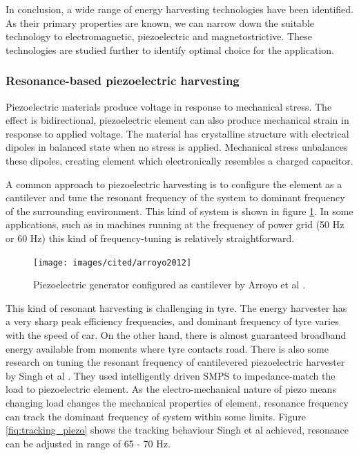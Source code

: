 In conclusion, a wide range of energy harvesting technologies have been identified. As their primary properties are known, we can narrow down the suitable technology to electromagnetic, piezoelectric and magnetostrictive. These technologies are studied further to identify optimal choice for the application.

\subsubsection{Resonance-based piezoelectric harvesting}
Piezoelectric materials produce voltage in response to mechanical stress. The effect is bidirectional, piezoelectric element can also produce mechanical strain in response to applied voltage. The material has crystalline structure with electrical dipoles in balanced state when no stress is applied. Mechanical stress unbalances these dipoles, creating element which electronically resembles a charged capacitor. 

A common approach to piezoelectric harvesting is to configure the element as a cantilever and tune the resonant frequency of the system to dominant frequency of the surrounding environment. This kind of system is shown in figure \ref{fiq:resonant_piezo}. In some applications, such as in machines running at the frequency of power grid (50 Hz or 60 Hz) this kind of frequency-tuning is relatively straightforward.

\begin{figure}[htb]
  \begin{center}
  \texttt{[image: images/cited/arroyo2012]}
  \end{center}
  \caption{Piezoelectric generator configured as cantilever by Arroyo et al \cite{Arroyo2012}.}
  \label{fiq:resonant_piezo}
\end{figure}

This kind of resonant harvesting is challenging in tyre. The energy harvester has a very sharp peak efficiency frequencies, and dominant frequency of tyre varies with the speed of car. On the other hand, there is almost guaranteed broadband energy available from moments where tyre contacts road. There is also some research on tuning the resonant frequency of cantilevered piezoelectric harvester by Singh et al \cite{Singh2012}. They used intelligently driven SMPS to impedance-match the load to piezoelectric element. As the electro-mechanical nature of piezo means changing load changes the mechanical properties of element, resonance frequency can track the dominant frequency of system within some limits. Figure \ref{fiq:tracking_piezo} shows the tracking behaviour Singh et al achieved, resonance can be adjusted in range of 65 - 70 Hz.

